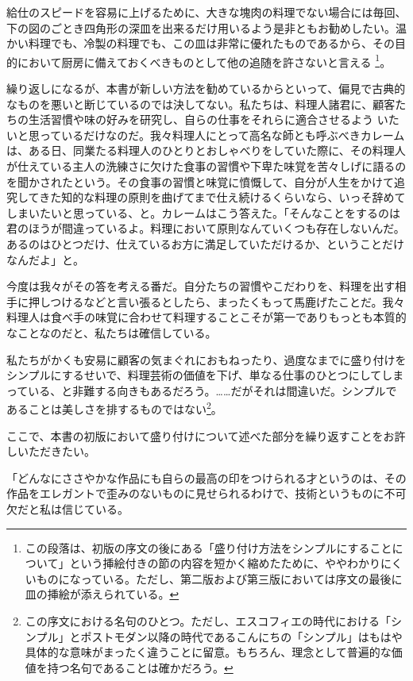 \begin{Main}
給仕のスピードを容易に上げるために、大きな塊肉の料理でない場合には毎回、下の図のごとき四角形の深皿を出来るだけ用いるよう是非ともお勧めしたい。温かい料理でも、冷製の料理でも、この皿は非常に優れたものであるから、その目的において厨房に備えておくべきものとして他の追随を許さないと言える
\footnote{この段落は、初版の序文の後にある「盛り付け方法をシンプルにすることについて」という挿絵付きの節の内容を短かく縮めたために、ややわかりにくいものになっている。ただし、第二版および第三版においては序文の最後に皿の挿絵が添えられている。}。

繰り返しになるが、本書が新しい方法を勧めているからといって、偏見で古典的なものを悪いと断じているのでは決してない。私たちは、料理人諸君に、顧客たちの生活習慣や味の好みを研究し、自らの仕事をそれらに適合させるよう
いたいと思っているだけなのだ。我々料理人にとって高名な師とも呼ぶべきカレームは、ある日、同業たる料理人のひとりとおしゃべりをしていた際に、その料理人が仕えている主人の洗練さに欠けた食事の習慣や下卑た味覚を苦々しげに語るのを聞かされたという。その食事の習慣と味覚に憤慨して、自分が人生をかけて追究してきた知的な料理の原則を曲げてまで仕え続けるくらいなら、いっそ辞めてしまいたいと思っている、と。カレームはこう答えた。「そんなことをするのは君のほうが間違っているよ。料理において原則なんていくつも存在しないんだ。あるのはひとつだけ、仕えているお方に満足していただけるか、ということだけなんだよ」と。

今度は我々がその答を考える番だ。自分たちの習慣やこだわりを、料理を出す相手に押しつけるなどと言い張るとしたら、まったくもって馬鹿げたことだ。我々料理人は食べ手の味覚に合わせて料理することこそが第一でありもっとも本質的なことなのだと、私たちは確信している。

私たちがかくも安易に顧客の気まぐれにおもねったり、過度なまでに盛り付けをシンプルにするせいで、料理芸術の価値を下げ、単なる仕事のひとつにしてしまっている、と非難する向きもあるだろう。\ldots{}\ldots{}だがそれは間違いだ。シンプルであることは美しさを排するものではない\footnote{この序文における名句のひとつ。ただし、エスコフィエの時代における「シンプル」とポストモダン以降の時代であるこんにちの「シンプル」はもはや具体的な意味がまったく違うことに留意。もちろん、理念として普遍的な価値を持つ名句であることは確かだろう。}。

ここで、本書の初版において盛り付けについて述べた部分を繰り返すことをお許しいただきたい。

「どんなにささやかな作品にも自らの最高の印をつけられる才というのは、その作品をエレガントで歪みのないものに見せられるわけで、技術というものに不可欠だと私は信じている。


\end{Main}
